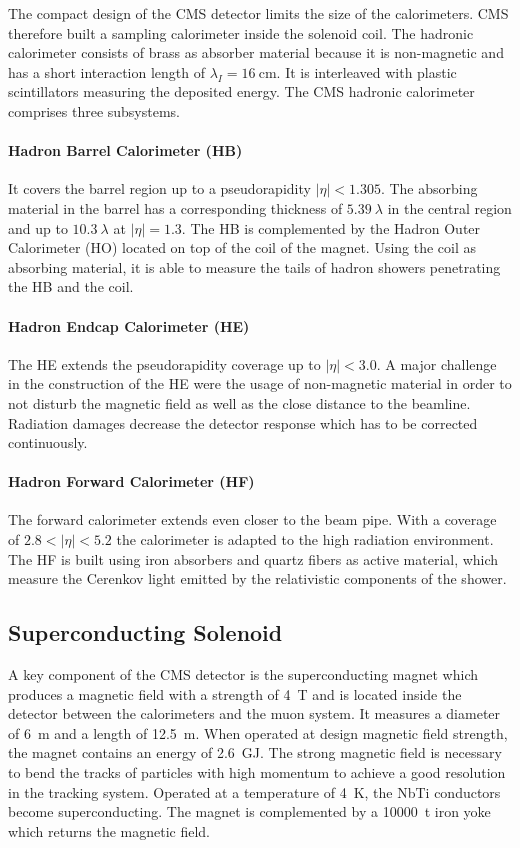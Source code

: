 The compact design of the CMS detector limits the size of the calorimeters. CMS
therefore built a sampling calorimeter inside the solenoid coil. The hadronic
calorimeter consists of brass as absorber material because it is non-magnetic and
has a short interaction length of $\lambda_I = \SI{16}{\centi\metre}$. It is
interleaved with plastic scintillators measuring the deposited energy. The CMS
hadronic calorimeter comprises three subsystems. 

\paragraph{Hadron Barrel Calorimeter (HB)}
It covers the barrel region up to a pseudorapidity $|\eta| < 1.305$. The
absorbing material in the barrel has a corresponding thickness of
$\SI{5.39}{\lambda}$ in the central region and up to $\SI{10.3}{\lambda}$ at $|\eta|
= 1.3$. The HB is complemented by the Hadron Outer Calorimeter (HO) located on
top of the coil of the magnet. Using the coil as absorbing material, it is able
to measure the tails of hadron showers penetrating the HB and the coil.

\paragraph{Hadron Endcap Calorimeter (HE)} The HE extends the pseudorapidity
coverage up to $|\eta| < 3.0$. A major challenge in the construction of the HE
were the usage of non-magnetic material in order to not disturb the magnetic field as
well as the close distance to the beamline. Radiation damages decrease the
detector response which has to be corrected continuously. 

\paragraph{Hadron Forward Calorimeter (HF)} 
The forward calorimeter extends even closer to the beam pipe. With a coverage of
$2.8 < |\eta| < 5.2$ the calorimeter is adapted to the high radiation
environment. The HF is built using iron absorbers and quartz fibers as active
material, which measure the Cerenkov light emitted by the relativistic
components of the shower.

\subsection{Superconducting Solenoid}

A key component of the CMS detector is the superconducting magnet which
produces a magnetic field with a strength of \SI{4}{\tesla} and is located
inside the detector between the calorimeters and the muon system. It measures a
diameter of \SI{6}{\meter} and a length of \SI{12.5}{\meter}. When operated at
design magnetic field strength, the magnet contains an energy of
\SI{2.6}{\giga\joule}. The strong magnetic field is necessary to bend the
tracks of particles with high momentum to achieve a good resolution in the
tracking system. Operated at a temperature of \SI{4}{\kelvin}, the NbTi conductors become
superconducting. The magnet is complemented by a \SI{10000}{\tonne} iron yoke
which returns the magnetic field.

